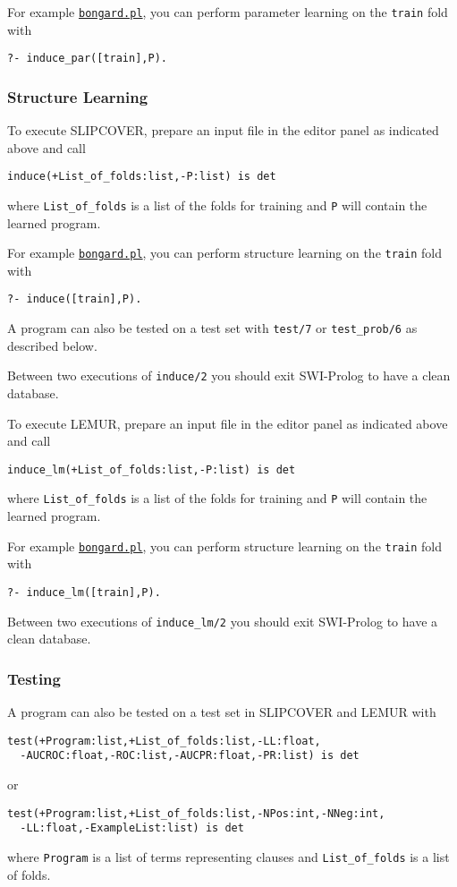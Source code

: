 For example \href{http://cplint.eu/example/bongard.pl}{\texttt{bongard.pl}}, you can 
perform parameter learning on the \verb|train| fold with 
\begin{verbatim}
?- induce_par([train],P).
\end{verbatim}


\subsubsection{Structure Learning}
To execute SLIPCOVER,
prepare an input file in the editor panel as indicated above 
and call
\begin{verbatim}
induce(+List_of_folds:list,-P:list) is det
\end{verbatim}
where \verb|List_of_folds| is a list of the folds for training and
\verb|P| will contain the learned program.

For example \href{http://cplint.eu/example/learning/bongard.pl}{\texttt{bongard.pl}}, you can perform structure learning on the \verb|train| fold with 
\begin{verbatim}
?- induce([train],P).
\end{verbatim}
A program can also be tested on a test set with \verb|test/7| or \verb|test_prob/6| as
described below.

Between two executions of \verb|induce/2| you should exit SWI-Prolog to have a 
clean database.

To execute LEMUR,
prepare an input file in the editor panel as indicated above 
and call
\begin{verbatim}
induce_lm(+List_of_folds:list,-P:list) is det
\end{verbatim}
where \verb|List_of_folds| is a list of the folds for training and
\verb|P| will contain the learned program.

For example \href{http://cplint.eu/example/lemur/bongard.pl}{\texttt{bongard.pl}}, you can perform structure learning on the \verb|train| fold with 
\begin{verbatim}
?- induce_lm([train],P).
\end{verbatim}

Between two executions of \verb|induce_lm/2| you should exit SWI-Prolog to have a 
clean database.

\subsubsection{Testing}


A program can also be tested on a test set in SLIPCOVER and LEMUR with
\begin{verbatim}
test(+Program:list,+List_of_folds:list,-LL:float,
  -AUCROC:float,-ROC:list,-AUCPR:float,-PR:list) is det
\end{verbatim}
or
\begin{verbatim}
test(+Program:list,+List_of_folds:list,-NPos:int,-NNeg:int,
  -LL:float,-ExampleList:list) is det
\end{verbatim}
where \verb|Program| is a list of terms representing clauses and
\verb|List_of_folds| is a list of folds.

